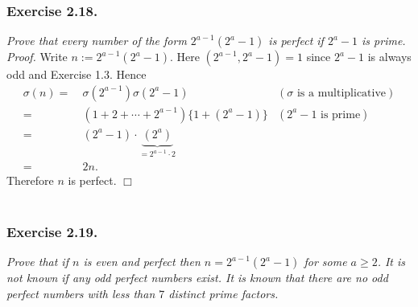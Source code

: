 \documentclass{article}
\begin{document}



\subsubsection*{Exercise 2.18.}
\emph{Prove that every number of the form $2^{a-1}(2^a-1)$ is perfect
if $2^a-1$ is prime.} \\



\emph{Proof.}
  Write $n := 2^{a-1}(2^a-1)$.
  Here $(2^{a-1}, 2^a - 1) = 1$ since $2^a - 1$ is always odd and Exercise 1.3.
  Hence
  \begin{align*}
    \sigma(n)
    =& \: \sigma(2^{a-1}) \sigma(2^a-1)
      &(\text{$\sigma$ is a multiplicative}) \\
    =& \: (1 + 2 + \cdots + 2^{a-1})\{1 + (2^a-1)\}
      &(\text{$2^a - 1$ is prime}) \\
    =& \: (2^a - 1) \cdot \underbrace{(2^a)}_{= 2^{a-1} \cdot 2} \\
    =& \: 2n.
  \end{align*}
  Therefore $n$ is perfect.
$\Box$ \\\\






\subsubsection*{Exercise 2.19.}
\emph{Prove that if $n$ is even and perfect then $n = 2^{a-1}(2^a-1)$ for some $a \geq 2$.
It is not known if any odd perfect numbers exist.
It is known that there are no odd perfect numbers with less than $7$ distinct prime factors.} \\
\end{document}
